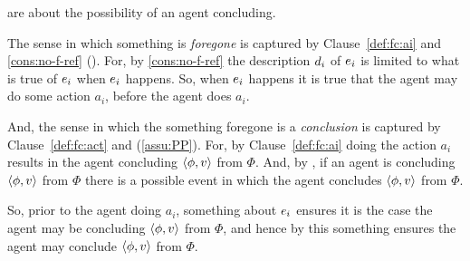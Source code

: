 \begin{note}
   are about the possibility of an agent concluding.

  The sense in which something is \emph{foregone} is captured by Clause~\ref{def:fc:ai} and \autoref{cons:no-f-ref} ().
  For, by \autoref{cons:no-f-ref} the description \(d\sb{i}\) of \(e\sb{i}\) is limited to what is true of \(e\sb{i}\) when \(e\sb{i}\) happens.
  So, when \(e\sb{i}\) happens it is true that the agent may do some action \(a_{i}\), before the agent does \(a_{i}\).

  And, the sense in which the something foregone is a \emph{conclusion} is captured by Clause~\ref{def:fc:act} and \assuPP{} (\autoref{assu:PP}).
  For, by Clause~\ref{def:fc:ai} doing the action \(a_{i}\) results in the agent concluding \(\langle\phi, v\rangle\) from \(\Phi\).
  And, by \assuPP{}, if an agent is concluding \(\langle\phi, v\rangle\) from \(\Phi\) there is a possible event in which the agent concludes \(\langle\phi, v\rangle\) from \(\Phi\).

  So, prior to the agent doing \(a_{i}\), something about \(e\sb{i}\) ensures it is the case the agent may be concluding \(\langle\phi, v\rangle\) from \(\Phi\), and hence by \assuPP{} this something ensures the agent may conclude \(\langle\phi, v\rangle\) from \(\Phi\).
\end{note}

